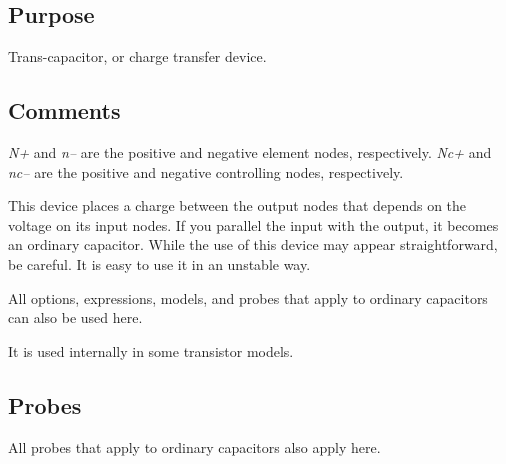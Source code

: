 \subsection{Purpose}

Trans-capacitor, or charge transfer device.
\subsection{Comments}

{\it N+} and {\it n--} are the positive and negative element nodes,
respectively.  {\it Nc+} and {\it nc--} are the positive and negative
controlling nodes, respectively. 

This device places a charge between the output nodes that depends on
the voltage on its input nodes.  If you parallel the input with the
output, it becomes an ordinary capacitor.  While the use of this
device may appear straightforward, be careful.  It is easy to use it
in an unstable way.

All options, expressions, models, and probes that apply to ordinary
capacitors can also be used here.

It is used internally in some transistor models.
\subsection{Probes}

All probes that apply to ordinary capacitors also apply here.
